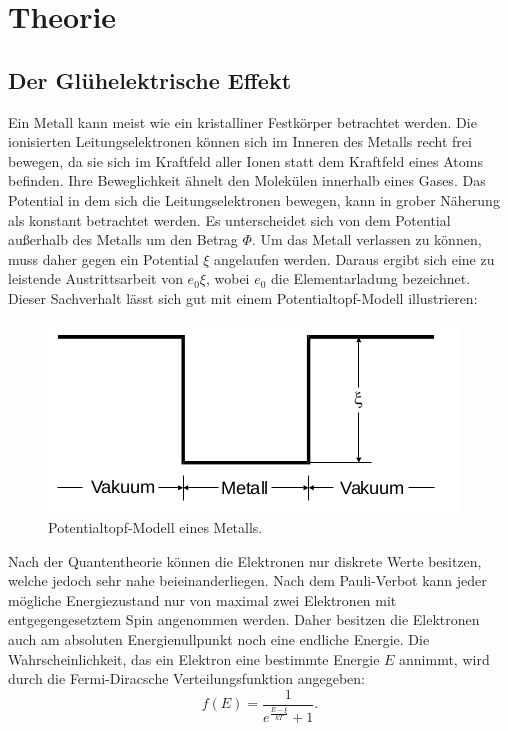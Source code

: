 \section{Theorie}
\label{sec:Theorie}

\subsection{Der Glühelektrische Effekt}
\label{sec:glühelektr}
Ein Metall kann meist wie ein kristalliner Festkörper betrachtet werden.
Die ionisierten Leitungselektronen können sich im Inneren des Metalls recht frei
bewegen, da sie sich im Kraftfeld aller Ionen statt dem Kraftfeld eines Atoms
befinden. Ihre Beweglichkeit ähnelt den Molekülen innerhalb eines Gases.
Das Potential in dem sich die Leitungselektronen bewegen, kann in grober
Näherung als konstant betrachtet werden. Es unterscheidet sich von dem Potential
außerhalb des Metalls um den Betrag $\Phi$.
Um das Metall verlassen zu können, muss daher gegen ein Potential $\xi$ angelaufen
werden. Daraus ergibt sich eine zu leistende Austrittsarbeit von $e_0 \xi$,
wobei $e_0$ die Elementarladung bezeichnet.
Dieser Sachverhalt lässt sich gut mit einem Potentialtopf-Modell illustrieren:
\begin{figure}[H]
  \centering
  \includegraphics[scale=0.5]{content/potentialtopf.png}
  \caption{Potentialtopf-Modell eines Metalls. \cite{AP01}}
  \label{fig:potentialtopf}
\end{figure}
\noindent
Nach der Quantentheorie können die Elektronen nur diskrete Werte besitzen, welche
jedoch sehr nahe beieinanderliegen. Nach dem Pauli-Verbot kann jeder
mögliche Energiezustand nur von maximal zwei Elektronen mit entgegengesetztem Spin
angenommen werden. Daher besitzen die Elektronen auch am absoluten Energienullpunkt
noch eine endliche Energie. Die Wahrscheinlichkeit, das ein Elektron eine bestimmte
Energie $E$ annimmt, wird durch die Fermi-Diracsche Verteilungsfunktion angegeben:
\begin{equation}
  f(E) = \frac{1}{e^{\frac{E - \xi}{k T}} + 1}.
  \label{eqn:fermidirac}
\end{equation}
